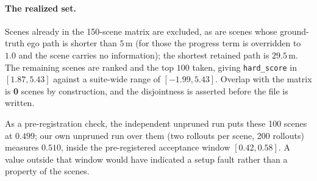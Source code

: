 \paragraph{The realized set.}
Scenes already in the 150-scene matrix are excluded, as are scenes whose
ground-truth ego path is shorter than $5$\,m (for those the progress term is overridden to
$1.0$ and the scene carries no information); the shortest retained path is
$29.5$\,m. The remaining scenes are ranked and the top
$100$ taken, giving \texttt{hard\_score} in
$[1.87, 5.43]$ against a suite-wide range of
$[-1.99, 5.43]$. Overlap with the matrix is
\textbf{0} scenes by construction, and the disjointness is
asserted before the file is written.

As a pre-registration check, the independent unpruned run puts these 100 scenes
at $0.499$; our own unpruned run over them (two rollouts per scene,
200 rollouts) measures $0.510$, inside the pre-registered
acceptance window $[0.42, 0.58]$. A value outside that window would have indicated a
setup fault rather than a property of the scenes.
